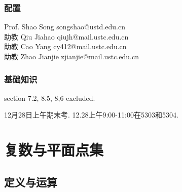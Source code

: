 \documentclass[../ComplexVariable.tex]{subfiles}
\begin{document}
\subsubsection*{配置} %

\noindent
Prof. Shao Song songshao@ustd.edu.cn \\
助教 Qiu Jiahao qiujh@mail.ustc.edu.cn\\
助教 Cao Yang cy412@mail.ustc.edu.cn\\
助教 Zhao Jianjie zjianjie@mail.ustc.edu.cn\\


\subsubsection*{基础知识} %
 
\centerline{
}
section 7.2, 8.5, 8,6 excluded.
\par
12月28日上午期末考. 12.28上午9:00-11:00在5303和5304.


\section{复数与平面点集} %
\label{sec:复数与平面点集}

\subsection{定义与运算} %
\label{sub:定义与运算}
\end{document}
